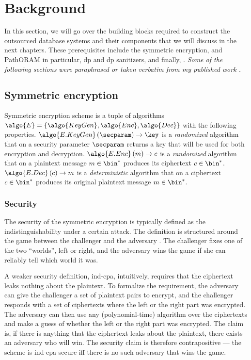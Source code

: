 \chapter{Background}\label{section:background}
\thispagestyle{myheadings}

	In this section, we will go over the building blocks required to construct the outsourced database systems and their components that we will discuss in the next chapters.
	These prerequisites include the symmetric encryption,  and PathORAM \cite{path-oram} in particular, \acrlong{dp} and \acrshort{dp} sanitizers, and finally, .
	\emph{Some of the following sections were paraphrased or taken verbatim from my published work \cite{ore-benchmark-17,epsolute}.}

	\section{Symmetric encryption}\label{section:background:encryption}

		Symmetric encryption scheme is a tuple of algorithms $\algo{E} = \{ \algo{KeyGen}, \algo{Enc}, \algo{Dec} \}$ with the following properties.
		$\algo{E.KeyGen} \left( \secparam \right) \to \key$ is a \emph{randomized} algorithm that on a security parameter $\secparam$ returns a key that will be used for both encryption and decryption.
		$\algo{E.Enc} \left( m \right) \to c$ is a \emph{randomized} algorithm that on a plaintext message $m \in \bin^*$ produces its ciphertext $c \in \bin^*$.
		$\algo{E.Dec} \left( c \right) \to m$ is a \emph{deterministic} algorithm that on a ciphertext $c \in \bin^*$ produces its original plaintext message $m \in \bin^*$.

		\subsection{Security}

			The security of the symmetric encryption is typically defined as the indistinguishability under a certain attack.
			The definition is structured around the game between the challenger and the adversary \adversary{}.
			The challenger fixes one of the two ``worlds'', left or right, and the adversary wins the game if she can reliably tell which world it was.

			A weaker security definition, \acrfull{ind-cpa}, intuitively, requires that the ciphertext leaks nothing about the plaintext.
			To formalize the requirement, the adversary can give the challenger a set of plaintext pairs to encrypt, and the challenger responds with a set of ciphertexts where the left or the right part was encrypted.
			The adversary can then use any (polynomial-time) algorithm over the ciphertexts and make a guess of whether the left or the right part was encrypted.
			The claim is, if there is anything that the ciphertext leaks about the plaintext, there exists an adversary who will win.
			The security claim is therefore contrapositive --- the scheme is \acrshort{ind-cpa} secure iff there is no such adversary that wins the game.

